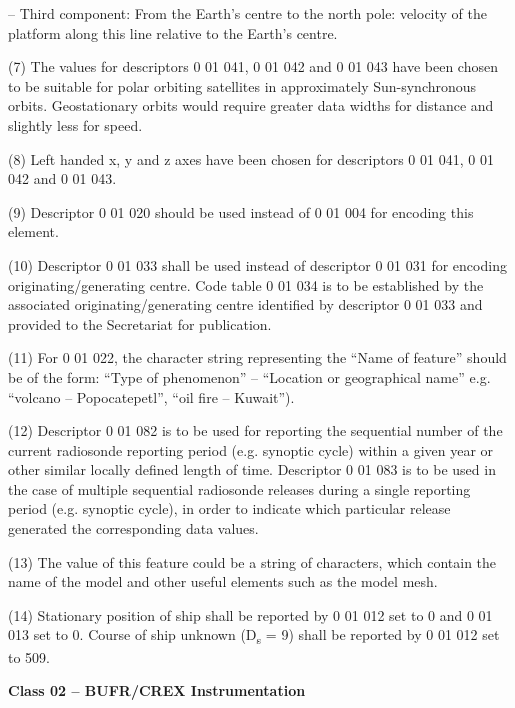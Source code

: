 -- Third component: From the Earth's centre to the north pole: velocity of the platform along this line relative to the Earth's centre.

(7) The values for descriptors 0 01 041, 0 01 042 and 0 01 043 have been chosen to be suitable for polar orbiting satellites in approximately Sun-synchronous orbits. Geostationary orbits would require greater data widths for distance and slightly less for speed.

(8) Left handed x, y and z axes have been chosen for descriptors 0 01 041, 0 01 042 and 0 01 043.

(9) Descriptor 0 01 020 should be used instead of 0 01 004 for encoding this element.

(10) Descriptor 0 01 033 shall be used instead of descriptor 0 01 031 for encoding originating/generating centre. Code table 0 01 034 is to be established by the associated originating/generating centre identified by descriptor 0 01 033 and provided to the Secretariat for publication.

(11) For 0 01 022, the character string representing the ``Name of feature'' should be of the form: ``Type of phenomenon'' -- ``Location or geographical name'' e.g. ``volcano -- Popocatepetl'', ``oil fire -- Kuwait'').

(12) Descriptor 0 01 082 is to be used for reporting the sequential number of the current radiosonde reporting period (e.g. synoptic cycle) within a given year or other similar locally defined length of time. Descriptor 0 01 083 is to be used in the case of multiple sequential radiosonde releases during a single reporting period (e.g. synoptic cycle), in order to indicate which particular release generated the corresponding data values.

(13) The value of this feature could be a string of characters, which contain the name of the model and other useful elements such as the model mesh.

(14) Stationary position of ship shall be reported by 0 01 012 set to 0 and 0 01 013 set to 0. Course of ship unknown (D\textsubscript{s} = 9) shall be reported by 0 01 012 set to 509.

\textbf{Class 02 -- BUFR/CREX Instrumentation}

